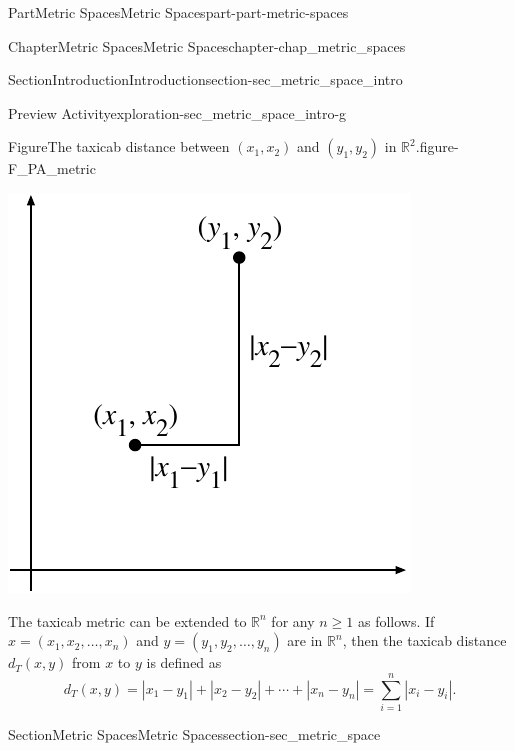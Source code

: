 \documentclass[oneside,10pt,]{book}
\numberwithin{equation}{chapter}
\newcommand{\R}{\mathbb{R}}
\begin{document}
\begin{partptx}{Part}{Metric Spaces}{}{Metric Spaces}{}{}{part-part-metric-spaces}
\begin{chapterptx}{Chapter}{Metric Spaces}{}{Metric Spaces}{}{}{chapter-chap_metric_spaces}
\begin{sectionptx}{Section}{Introduction}{}{Introduction}{}{}{section-sec_metric_space_intro}
\begin{exploration}{Preview Activity}{}{exploration-sec_metric_space_intro-g}
\begin{enumerate}[font=\bfseries,label=(\alph*),ref=\alph*]
\begin{figureptx}{Figure}{The taxicab distance between \((x_1,x_2)\) and \((y_1,y_2)\) in \(\R^2\).}{figure-F_PA_metric}{}
\begin{image}{0.25}{0.5}{0.25}{}
\includegraphics[width=\linewidth]{external/Taxicab.pdf}
\end{image}%
\tcblower
\end{figureptx}%
\end{enumerate}%
\end{exploration}%
The taxicab metric can be extended to \(\R^n\) for any \(n \geq 1\) as follows. If \(x = (x_1, x_2, \ldots,
x_n)\) and \(y = (y_1, y_2, \ldots,
y_n)\) are in \(\R^n\), then the taxicab distance \(d_T(x,y)\) from \(x\) to \(y\) is defined as%
\begin{equation*}
d_T(x,y) = |x_1-y_1| + |x_2-y_2| + \cdots + |x_n-y_n| = \sum_{i=1}^n |x_i-y_i|\text{.}
\end{equation*}
%
\end{sectionptx}
%
%
\typeout{************************************************}
\typeout{************************************************}
%
\begin{sectionptx}{Section}{Metric Spaces}{}{Metric Spaces}{}{}{section-sec_metric_space}

\end{sectionptx}
\end{chapterptx}
\end{partptx}
\end{document}
